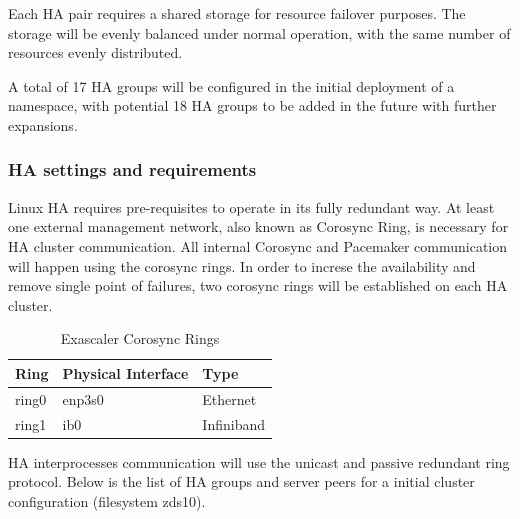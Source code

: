 \documentclass{article}
\begin{document}
Each HA pair requires a shared storage for resource failover purposes. The storage will be evenly balanced under normal operation, with the same number of resources evenly distributed. 

A total of 17 HA groups will be configured in the initial deployment of a namespace, with potential 18 HA groups to be added in the future with further expansions. 

\subsubsection{HA settings and requirements}
Linux HA requires pre-requisites to operate in its fully redundant way. At least one external management network, also known as Corosync Ring, is necessary for HA cluster communication. All internal Corosync and Pacemaker communication will happen using the corosync rings. In order to increse the availability and remove single point of failures, two corosync rings will be established on each HA cluster.

\begin{table}[htbp]
\centering
\begin{tabular}{|l|l|l|}
    \hline
    \textbf{Ring} & \textbf{Physical Interface} & \textbf{Type}\\
    \hline
    ring0 & enp3s0 & Ethernet \\
    ring1 & ib0 & Infiniband \\
    \hline
\end{tabular}
\caption{Exascaler Corosync Rings}
\label{tab:es-corosync-rings}
\end{table}

HA interprocesses communication will use the unicast and passive redundant ring protocol. 
Below is the list of HA groups and server peers for a initial cluster configuration (filesystem zds10).
\end{document}
